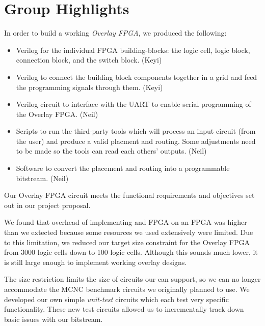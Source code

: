 \section*{Group Highlights}

In order to build a working \emph{Overlay FPGA}, we produced the following:
\begin{itemize}
\item Verilog for the individual FPGA building-blocks: the logic cell, logic block, connection block, and the switch block. (Keyi)
\item Verilog to connect the building block components together in a grid and feed the programming signals through them. (Keyi)
\item Verilog circuit to interface with the UART to enable serial programming of the Overlay FPGA. (Neil)
\item Scripts to run the third-party tools which will process an input circuit (from the user) and produce a valid placment and routing. Some adjustments need to be made so the tools can read each others' outputs. (Neil)
\item Software to convert the placement and routing into a programmable bitstream. (Neil)
\end{itemize}

Our Overlay FPGA circuit meets the functional requirements and objectives set out in our project proposal.

We found that overhead of implementing and FPGA on an FPGA was higher than we extected because some resources we used extensively were limited.
Due to this limitation, we reduced our target size constraint for the Overlay FPGA from 3000 logic cells down to 100 logic cells. %
Although this sounds much lower, it is still large enough to implement working overlay designs.

The size restriction limits the size of circuits our \overlay can support, so we can no longer accommodate the MCNC benchmark circuits we originally planned to use.
We developed our own simple \emph{unit-test} circuits which each test very specific functionality.
These new test circuits allowed us to incrementally track down basic issues with our bitstream.

